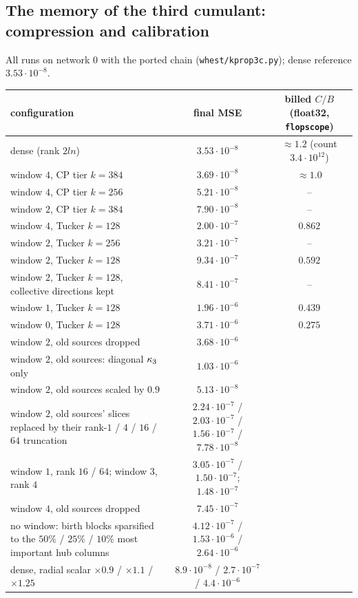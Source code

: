 \subsection{The memory of the third cumulant: compression and calibration}
All runs on network $0$ with the ported chain (\texttt{whest/kprop3c.py}); dense reference $3.53\cdot10^{-8}$.
\begin{center}\small
\begin{tabular}{lcc}\toprule
configuration & final MSE & billed $C/B$ (float32, \texttt{flopscope}) \\\midrule
dense (rank $2ln$) & $3.53\cdot10^{-8}$ & $\approx1.2$ (count $3.4\cdot10^{12}$) \\
window $4$, CP tier $k=384$ & $3.69\cdot10^{-8}$ & $\approx1.0$ \\
window $4$, CP tier $k=256$ & $5.21\cdot10^{-8}$ & -- \\
window $2$, CP tier $k=384$ & $7.90\cdot10^{-8}$ & -- \\
window $4$, Tucker $k=128$ & $2.00\cdot10^{-7}$ & $0.862$ \\
window $2$, Tucker $k=256$ & $3.21\cdot10^{-7}$ & -- \\
window $2$, Tucker $k=128$ & $9.34\cdot10^{-7}$ & $0.592$ \\
window $2$, Tucker $k=128$, collective directions kept & $8.41\cdot10^{-7}$ & -- \\
window $1$, Tucker $k=128$ & $1.96\cdot10^{-6}$ & $0.439$ \\
window $0$, Tucker $k=128$ & $3.71\cdot10^{-6}$ & $0.275$ \\\midrule
window $2$, old sources dropped & $3.68\cdot10^{-6}$ & \\
window $2$, old sources: diagonal $\kappa_3$ only & $1.03\cdot10^{-6}$ & \\
window $2$, old sources scaled by $0.9$ & $5.13\cdot10^{-8}$ & \\
window $2$, old sources' slices replaced by their rank-$1$ / $4$ / $16$ / $64$ truncation & $2.24\cdot10^{-7}$ / $2.03\cdot10^{-7}$ / $1.56\cdot10^{-7}$ / $7.78\cdot10^{-8}$ & \\
window $1$, rank $16$ / $64$; window $3$, rank $4$ & $3.05\cdot10^{-7}$ / $1.50\cdot10^{-7}$; $1.48\cdot10^{-7}$ & \\
window $4$, old sources dropped & $7.45\cdot10^{-7}$ & \\
no window: birth blocks sparsified to the $50\%$ / $25\%$ / $10\%$ most important hub columns & $4.12\cdot10^{-7}$ / $1.53\cdot10^{-6}$ / $2.64\cdot10^{-6}$ & \\\midrule
dense, radial scalar $\times0.9$ / $\times1.1$ / $\times1.25$ & $8.9\cdot10^{-8}$ / $2.7\cdot10^{-7}$ / $4.4\cdot10^{-6}$ & \\
\bottomrule\end{tabular}
\end{center}
